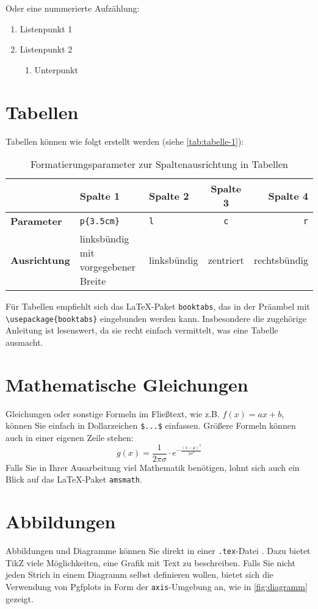 Oder eine nummerierte Aufzählung:
\begin{enumerate}
\item Listenpunkt 1
\item Listenpunkt 2
\begin{enumerate}
\item Unterpunkt
\end{enumerate}
\end{enumerate}

\section{Tabellen}
Tabellen können wie folgt erstellt werden (siehe \autoref{tab:tabelle-1}):
\begin{table}[htb]
\centering
\caption{Formatierungsparameter zur Spaltenausrichtung in Tabellen\label{tab:tabelle-1}}
\begin{tabular}{l|p{3.5cm}lcr}
	                     & \textbf{Spalte 1}                   & \textbf{Spalte 2} & \textbf{Spalte 3} & \textbf{Spalte 4} \\ \hline
	\textbf{Parameter}   & \verb|p{3.5cm}|                     & \verb|l|          &     \verb|c|      &          \verb|r| \\
	\textbf{Ausrichtung} & linksbündig mit vorgegebener Breite & linksbündig       &     zentriert     &      rechtsbündig
\end{tabular}
\end{table}

Für  Tabellen empfiehlt sich das \LaTeX-Paket \verb|booktabs|, das in der Präambel mit \verb|\usepackage{booktabs}| eingebunden werden kann. Insbesondere die zugehörige Anleitung \cite{booktabs} ist lesenswert, da sie recht einfach vermittelt, was eine  Tabelle ausmacht.

\section{Mathematische Gleichungen}
Gleichungen oder sonstige Formeln im Fließtext, wie z.B. $f(x)=ax+b$, können Sie einfach in Dollarzeichen \verb|$...$| einfassen. Größere Formeln können auch in einer eigenen Zeile stehen:
\begin{displaymath}
g(x) = \frac{1}{2\pi\sigma}\cdot e^{-\frac{(x-\mu)^2}{2\sigma^2}}
\end{displaymath}
Falls Sie in Ihrer Ausarbeitung viel Mathematik benötigen, lohnt sich auch ein Blick auf das \LaTeX-Paket \verb|amsmath|.
\section{Abbildungen}
Abbildungen und Diagramme können Sie direkt in einer \verb|.tex|-Datei . Dazu bietet TikZ viele Möglichkeiten, eine Grafik mit Text zu beschreiben. Falls Sie nicht jeden Strich in einem Diagramm selbst definieren wollen, bietet sich die Verwendung von Pgfplots in Form der \verb|axis|-Umgebung an, wie in \autoref{fig:diagramm} gezeigt.

